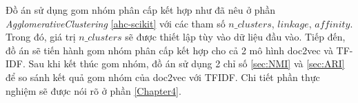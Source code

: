 Đồ án sử dụng gom nhóm phân cấp kết hợp như đã nêu ở phần \textit{AgglomerativeClustering} \ref{ahc-scikit} với các tham số $n{\_}clusters$, $linkage$, $affinity$.
Trong đó, giá trị $n{\_}clusters$ sẽ được thiết lập tùy vào dữ liệu đầu vào.
Tiếp đến, đồ án sẽ tiến hành gom nhóm phân cấp kết hợp cho cả 2 mô hình doc2vec và TF-IDF.
Sau khi kết thúc gom nhóm, đồ án sử dụng 2 chỉ số \ref{sec:NMI} và \ref{sec:ARI} để so sánh kết quả gom nhóm của doc2vec với TFIDF.
Chi tiết phần thực nghiệm sẽ được nói rõ ở phần \ref{Chapter4}.
%
%
%
%

